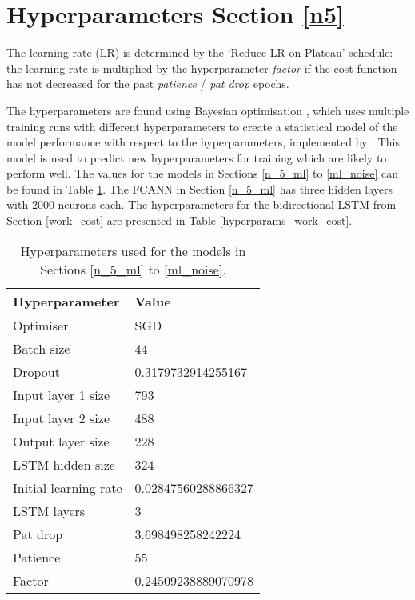 \section{Hyperparameters Section \ref{n5}}
The learning rate (LR) is determined by the `Reduce LR on Plateau' schedule:
the learning rate is multiplied by the hyperparameter \textit{factor} if the cost function has not decreased for the past \textit{patience} / \textit{pat drop} epochs.

The hyperparameters are found using Bayesian optimisation \cite{10.5555/2999325.2999464}, which uses multiple training runs with different hyperparameters to create a statistical model of the model performance with respect to the hyperparameters, implemented by \cite{wandb}.
This model is used to predict new hyperparameters for training which are likely to perform well.
The values for the models in Sections \ref{n_5_ml} to \ref{ml_noise} can be found in Table \ref{hyperparams_n_5}.
The FCANN in Section \ref{n_5_ml} has three hidden layers with 2000 neurons each.
The hyperparameters for the bidirectional LSTM from Section \ref{work_cost} are presented in Table \ref{hyperparams_work_cost}.

\begin{table}[h]
	\centering
	\begin{tabular}{l | l}
		Hyperparameter & Value \\
		\hline
		Optimiser & SGD \\
		Batch size & 44 \\
		Dropout & 0.3179732914255167 \\
		Input layer 1 size & 793 \\
		Input layer 2 size & 488 \\
		Output layer size & 228 \\
		LSTM hidden size & 324 \\
		Initial learning rate & 0.02847560288866327 \\
		LSTM layers & 3 \\
		Pat drop & 3.698498258242224 \\
		Patience & 55 \\
		Factor & 0.24509238889070978
	\end{tabular}
	\caption{Hyperparameters used for the models in Sections \ref{n_5_ml} to \ref{ml_noise}.}
	\label{hyperparams_n_5}
\end{table}

